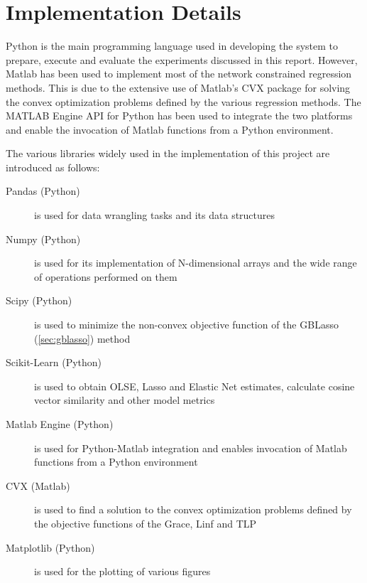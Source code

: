 \chapter{Implementation Details}
Python is the main programming language used in developing the system to prepare, execute and evaluate the experiments discussed in this report. However, Matlab has been used to implement most of the network constrained regression methods. This is due to the extensive use of Matlab's CVX package \cite{grant2014cvx}\cite{grant2008graph} for solving the convex optimization problems defined by the various regression methods. The MATLAB Engine API for Python has been used to integrate the two platforms and enable the invocation of Matlab functions from a Python environment.

The various libraries widely used in the implementation of this project are introduced as follows:
\begin{description}
	\item[Pandas (Python)] is used for data wrangling tasks and its data structures
	\item[Numpy (Python)] is used for its implementation of N-dimensional arrays and the wide range of operations performed on them
	\item[Scipy (Python)] is used to minimize the non-convex objective function of the GBLasso (\ref{sec:gblasso}) method
	\item[Scikit-Learn (Python)] is used to obtain OLSE, Lasso and Elastic Net estimates, calculate cosine vector similarity and other model metrics 
	\item[Matlab Engine (Python)] is used for Python-Matlab integration and enables invocation of Matlab functions from a Python environment
	\item[CVX (Matlab)] is used to find a solution to the convex optimization problems defined by the objective functions of the Grace, Linf and TLP
	\item[Matplotlib (Python)] is used for the plotting of various figures
\end{description}

